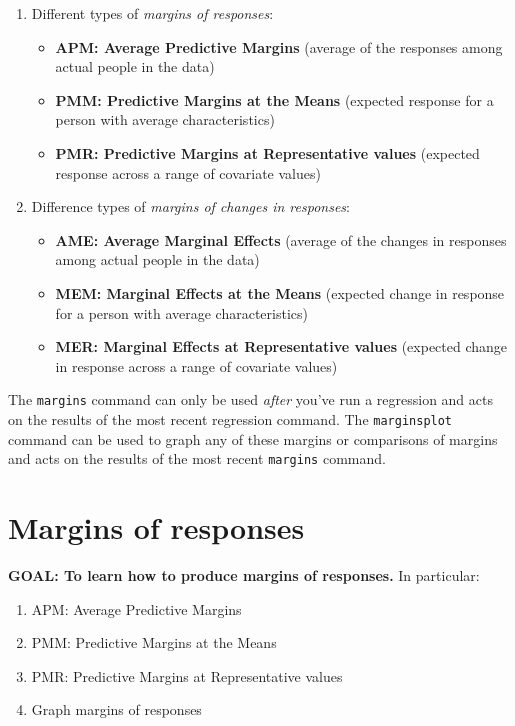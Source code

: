 \documentclass[
]{book}
\providecommand{\tightlist}{%
  \setlength{\itemsep}{0pt}\setlength{\parskip}{0pt}}
\begin{document}
\begin{enumerate}
\def\labelenumi{\arabic{enumi}.}
\tightlist
\item
  Different types of \emph{margins of responses}:

  \begin{itemize}
  \tightlist
  \item
    \textbf{APM: Average Predictive Margins} (average of the responses among actual people in the data)
  \item
    \textbf{PMM: Predictive Margins at the Means} (expected response for a person with average characteristics)
  \item
    \textbf{PMR: Predictive Margins at Representative values} (expected response across a range of covariate values)
  \end{itemize}
\item
  Difference types of \emph{margins of changes in responses}:

  \begin{itemize}
  \tightlist
  \item
    \textbf{AME: Average Marginal Effects} (average of the changes in responses among actual people in the data)
  \item
    \textbf{MEM: Marginal Effects at the Means} (expected change in response for a person with average characteristics)
  \item
    \textbf{MER: Marginal Effects at Representative values} (expected change in response across a range of covariate values)
  \end{itemize}
\end{enumerate}

The \texttt{margins} command can only be used \emph{after} you've run a regression and acts on the results of the most recent regression command. The \texttt{marginsplot} command can be used to graph any of these margins or comparisons of margins and acts on the results of the most recent \texttt{margins} command.

\hypertarget{margins-of-responses}{%
\section{Margins of responses}\label{margins-of-responses}}

\textbf{GOAL: To learn how to produce margins of responses.} In particular:

\begin{enumerate}
\def\labelenumi{\arabic{enumi}.}
\tightlist
\item
  APM: Average Predictive Margins\\
\item
  PMM: Predictive Margins at the Means
\item
  PMR: Predictive Margins at Representative values
\item
  Graph margins of responses
\end{enumerate}
\end{document}
